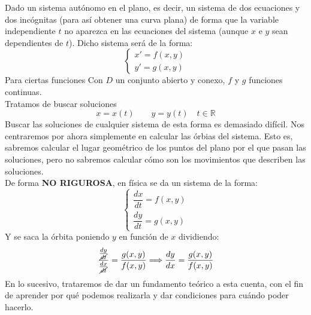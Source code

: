 Dado un sistema autónomo en el plano, es decir, un sistema de dos ecuaciones y dos incógnitas (para así obtener una curva plana) de forma que la variable independiente $t$ no aparezca en las ecuaciones del sistema (aunque $x$ e $y$ sean dependientes de $t$). Dicho sistema será de la forma:
\begin{equation*}
    \left\{\begin{array}{c}
            x' = f(x,y) \\
            y' = g(x,y)
    \end{array}\right.
\end{equation*}
Para ciertas funciones
Con $D$ un conjunto abierto y conexo, $f$ y $g$ funciones continuas.\\

Tratamos de buscar soluciones
\begin{equation*}
    x=x(t) \qquad y=y(t) \quad t\in \mathbb{R}
\end{equation*}
Buscar las soluciones de cualquier sistema de esta forma es demasiado difícil. Nos centraremos por ahora simplemente en calcular las órbias del sistema. Esto es, sabremos calcular el lugar geométrico de los puntos del plano por el que pasan las soluciones, pero no sabremos calcular cómo son los movimientos que describen las soluciones.\\

\noindent
De forma \textbf{NO RIGUROSA}, en física se da un sistema de la forma:
\begin{equation*}
    \left\{\begin{array}{c}
        \dfrac{dx}{dt} = f(x,y) \\
        \dfrac{dy}{dt} = g(x,y)
    \end{array}\right.
\end{equation*}
Y se saca la órbita poniendo $y$ en función de $x$ dividiendo:
\begin{equation*}
    \dfrac{\frac{dy}{\cancel{dt}}}{\frac{dx}{\cancel{dt}}} = \dfrac{g(x,y)}{f(x,y)} \Longrightarrow \dfrac{dy}{dx} = \dfrac{g(x,y)}{f(x,y)}
\end{equation*}
En lo sucesivo, trataremos de dar un fundamento teórico a esta cuenta, con el fin de aprender por qué podemos realizarla y dar condiciones para cuándo poder hacerlo.

